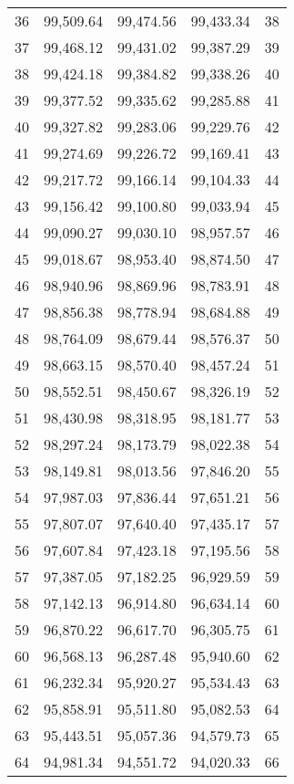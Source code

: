 \documentclass[12pt]{article}
\begin{document}
\begin{longtable}{rrrrr}
   36 & 99,509.64 & 99,474.56 & 99,433.34 &  38 \\ 
   37 & 99,468.12 & 99,431.02 & 99,387.29 &  39 \\ 
   38 & 99,424.18 & 99,384.82 & 99,338.26 &  40 \\ 
   39 & 99,377.52 & 99,335.62 & 99,285.88 &  41 \\ 
   40 & 99,327.82 & 99,283.06 & 99,229.76 &  42 \\ 
   41 & 99,274.69 & 99,226.72 & 99,169.41 &  43 \\ 
   42 & 99,217.72 & 99,166.14 & 99,104.33 &  44 \\ 
   43 & 99,156.42 & 99,100.80 & 99,033.94 &  45 \\ 
   44 & 99,090.27 & 99,030.10 & 98,957.57 &  46 \\ 
   45 & 99,018.67 & 98,953.40 & 98,874.50 &  47 \\ 
   46 & 98,940.96 & 98,869.96 & 98,783.91 &  48 \\ 
   47 & 98,856.38 & 98,778.94 & 98,684.88 &  49 \\ 
   48 & 98,764.09 & 98,679.44 & 98,576.37 &  50 \\ 
   49 & 98,663.15 & 98,570.40 & 98,457.24 &  51 \\ 
   50 & 98,552.51 & 98,450.67 & 98,326.19 &  52 \\ 
   51 & 98,430.98 & 98,318.95 & 98,181.77 &  53 \\ 
   52 & 98,297.24 & 98,173.79 & 98,022.38 &  54 \\ 
   53 & 98,149.81 & 98,013.56 & 97,846.20 &  55 \\ 
   54 & 97,987.03 & 97,836.44 & 97,651.21 &  56 \\ 
   55 & 97,807.07 & 97,640.40 & 97,435.17 &  57 \\ 
   56 & 97,607.84 & 97,423.18 & 97,195.56 &  58 \\ 
   57 & 97,387.05 & 97,182.25 & 96,929.59 &  59 \\ 
   58 & 97,142.13 & 96,914.80 & 96,634.14 &  60 \\ 
   59 & 96,870.22 & 96,617.70 & 96,305.75 &  61 \\ 
   60 & 96,568.13 & 96,287.48 & 95,940.60 &  62 \\ 
   61 & 96,232.34 & 95,920.27 & 95,534.43 &  63 \\ 
   62 & 95,858.91 & 95,511.80 & 95,082.53 &  64 \\ 
   63 & 95,443.51 & 95,057.36 & 94,579.73 &  65 \\ 
   64 & 94,981.34 & 94,551.72 & 94,020.33 &  66 \\ 

\end{longtable}
\end{document}
